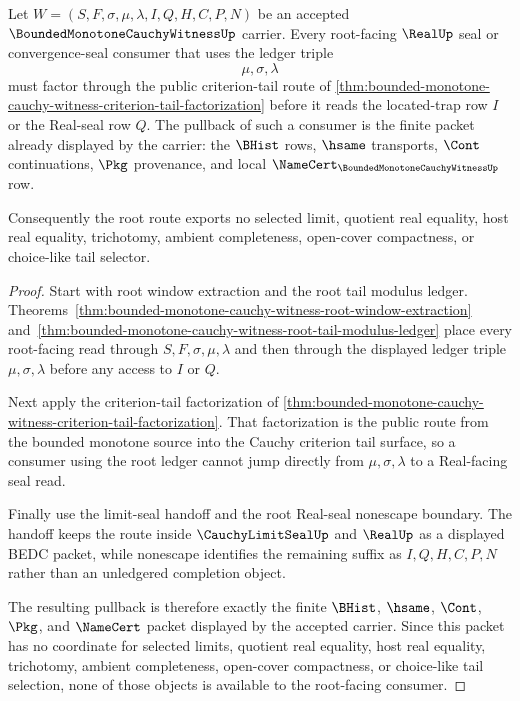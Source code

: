 \begin{theorem}\label{thm:bounded-monotone-cauchy-witness-root-criterion-tail-pullback}
Let $W=(S,F,\sigma,\mu,\lambda,I,Q,H,C,P,N)$ be an accepted $\BoundedMonotoneCauchyWitnessUp$ carrier. Every root-facing $\RealUp$ seal or convergence-seal consumer that uses the ledger triple
$$
\mu,\sigma,\lambda
$$
must factor through the public criterion-tail route of \autoref{thm:bounded-monotone-cauchy-witness-criterion-tail-factorization} before it reads the located-trap row $I$ or the Real-seal row $Q$. The pullback of such a consumer is the finite packet already displayed by the carrier: the $\BHist$ rows, $\hsame$ transports, $\Cont$ continuations, $\Pkg$ provenance, and local $\NameCert_{\BoundedMonotoneCauchyWitnessUp}$ row.

Consequently the root route exports no selected limit, quotient real equality, host real equality, trichotomy, ambient completeness, open-cover compactness, or choice-like tail selector.
\end{theorem}
\begin{proof}
Start with root window extraction and the root tail modulus ledger. Theorems~\ref{thm:bounded-monotone-cauchy-witness-root-window-extraction} and~\ref{thm:bounded-monotone-cauchy-witness-root-tail-modulus-ledger} place every root-facing read through $S,F,\sigma,\mu,\lambda$ and then through the displayed ledger triple $\mu,\sigma,\lambda$ before any access to $I$ or $Q$.

Next apply the criterion-tail factorization of \autoref{thm:bounded-monotone-cauchy-witness-criterion-tail-factorization}. That factorization is the public route from the bounded monotone source into the Cauchy criterion tail surface, so a consumer using the root ledger cannot jump directly from $\mu,\sigma,\lambda$ to a Real-facing seal read.

Finally use the limit-seal handoff and the root Real-seal nonescape boundary. The handoff keeps the route inside $\CauchyLimitSealUp$ and $\RealUp$ as a displayed BEDC packet, while nonescape identifies the remaining suffix as $I,Q,H,C,P,N$ rather than an unledgered completion object.

The resulting pullback is therefore exactly the finite $\BHist$, $\hsame$, $\Cont$, $\Pkg$, and $\NameCert$ packet displayed by the accepted carrier. Since this packet has no coordinate for selected limits, quotient real equality, host real equality, trichotomy, ambient completeness, open-cover compactness, or choice-like tail selection, none of those objects is available to the root-facing consumer.
\end{proof}

